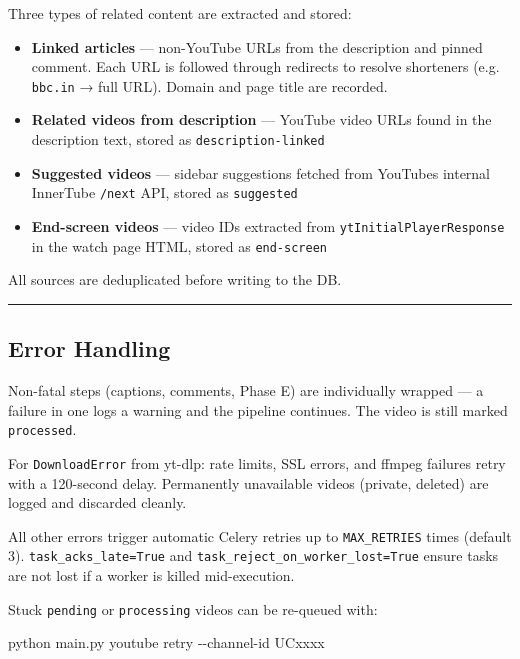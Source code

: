 \documentclass[
]{article}
\newenvironment{Shaded}{}{}
\newcommand{\AttributeTok}[1]{\textcolor[rgb]{0.49,0.56,0.16}{#1}}
\newcommand{\ExtensionTok}[1]{#1}
\newcommand{\NormalTok}[1]{#1}
\providecommand{\tightlist}{%
  \setlength{\itemsep}{0pt}\setlength{\parskip}{0pt}}
\begin{document}
Three types of related content are extracted and stored:

\begin{itemize}
\tightlist
\item
  \textbf{Linked articles} --- non-YouTube URLs from the description and
  pinned comment. Each URL is followed through redirects to resolve
  shorteners (e.g. \texttt{bbc.in} → full URL). Domain and page title
  are recorded.
\item
  \textbf{Related videos from description} --- YouTube video URLs found
  in the description text, stored as \texttt{description-linked}
\item
  \textbf{Suggested videos} --- sidebar suggestions fetched from
  YouTube\textquotesingle s internal InnerTube \texttt{/next} API,
  stored as \texttt{suggested}
\item
  \textbf{End-screen videos} --- video IDs extracted from
  \texttt{ytInitialPlayerResponse} in the watch page HTML, stored as
  \texttt{end-screen}
\end{itemize}

All sources are deduplicated before writing to the DB.

\begin{center}\rule{0.5\linewidth}{0.5pt}\end{center}

\subsection{Error Handling}\label{error-handling}

Non-fatal steps (captions, comments, Phase E) are individually wrapped
--- a failure in one logs a warning and the pipeline continues. The
video is still marked \texttt{processed}.

For \texttt{DownloadError} from yt-dlp: rate limits, SSL errors, and
ffmpeg failures retry with a 120-second delay. Permanently unavailable
videos (private, deleted) are logged and discarded cleanly.

All other errors trigger automatic Celery retries up to
\texttt{MAX\_RETRIES} times (default 3). \texttt{task\_acks\_late=True}
and \texttt{task\_reject\_on\_worker\_lost=True} ensure tasks are not
lost if a worker is killed mid-execution.

Stuck \texttt{pending} or \texttt{processing} videos can be re-queued
with:

\begin{Shaded}
\begin{Highlighting}[]
\ExtensionTok{python}\NormalTok{ main.py youtube retry }\AttributeTok{{-}{-}channel{-}id}\NormalTok{ UCxxxx}
\end{Highlighting}
\end{Shaded}
\end{document}
